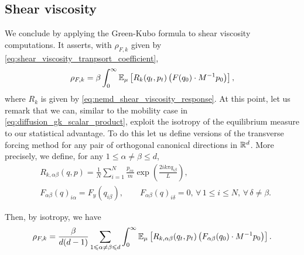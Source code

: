 \subsection{Shear viscosity}
We conclude by applying the Green-Kubo formula to shear viscosity computations. It asserts, with $\rho_{F,k}$ given by \eqref{eq:shear_viscosity_tranpsort_coefficient},
\begin{equation}
    \label{eq:green_kubo_viscosity}
    \rho_{F,k}=\beta\int_0^\infty \mathbb{E}_\mu\left[R_k(q_t,p_t)\left(F(q_0)\cdot M^{-1}p_0\right)\right],
\end{equation}
where $R_k$ is given by \eqref{eq:nemd_shear_viscosity_response}.
At this point, let us remark that we can, similar to the mobility case in \eqref{eq:diffusion_gk_scalar_product}, exploit the isotropy of the equilibrium measure to our statistical advantage.
To do this let us define versions of the transverse forcing method for any pair of orthogonal canonical directions in $\mathbb{R}^d$. More precisely,
we define, for any $1\leq \alpha \neq \beta \leq d$,
\begin{align*}
    &R_{k,\alpha\beta}(q,p)=\frac{1}N\sum_{i=1}^N\frac{p_{i\alpha}}{m}\exp\left(\frac{2ik\pi q_{i\beta}}{L}\right),\\
    &F_{\alpha\beta}(q)_{i\alpha}=F_y(q_{i\beta}),\qquad F_{\alpha\beta}(q)_{i\delta}=0,\,\forall\, 1\leq i\leq N,\, \forall\, \delta \neq \beta.
\end{align*}

Then, by isotropy, we have
\begin{equation}
    \label{eq:green_kubo_viscosity_isotropic}
    \rho_{F,k}=\frac{\beta}{d(d-1)}\sum_{1\leqslant \alpha\neq\beta \leqslant d}\int_0^\infty\mathbb{E}_\mu\left[R_{k,\alpha\beta}(q_t,p_t)\left(F_{\alpha\beta}(q_0)\cdot M^{-1}p_0\right)\right].
\end{equation}

